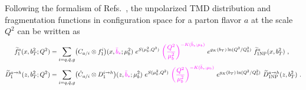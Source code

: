 \documentclass[aps,preprintnumbers,showpacs,nofootinbib,superscriptaddress,floatfix]{revtex4}
\newcommand{\AS}[1]{{\textcolor[rgb]{1,0,1}{#1}}}
\newcommand{\bT}{b_T}
\begin{document}
Following the formalism of Refs.~\cite{Collins:2011zzd,Aybat:2011zv}, the
unpolarized TMD distribution and fragmentation functions in configuration
space for a parton flavor $a$ at the scale $Q^2$ can be written as 
\begin{align}   
\widetilde{f}_1^a (x,  \bT^2; Q^2) &= \sum_{i=q,\bar q,g} \bigl( C_{a/i} \otimes f_1^i \bigr) (x,\AS{\bar{b}_\ast}; \mu_b^2) 
\  e^{S (\mu_b^2, Q^2)} \ \AS{\bigg( \frac{Q^2}{\mu_b^2} \bigg)^{-K(\bar{b}_\ast;\mu_b)}} \  e^{g_K(\bT) \ln (Q^2 / Q_0^2)} \  \widetilde{f}_{1 {\rm NP}}^a (x, \bT^2) \ ,
\label{e:TMDevol1} \\
\widetilde{D}_1^{a\to h} (z, \bT^2; Q^2) &= \sum_{i=q,\bar q,g} \bigl( \hat{C}_{a/i} \otimes D_1^{i\to h} \bigr) (z,\AS{\bar{b}_\ast}; \mu_b^2) \  e^{S (\mu_b^2, Q^2)} \ \AS{\bigg( \frac{Q^2}{\mu_b^2} \bigg)^{-K(\bar{b}_\ast;\mu_b)}} \  e^{g_K( \bT) \ln (Q^2 / Q_0^2)} \  \widetilde{D}_{1 {\rm NP}}^{a\to h} (z, \bT^2) \  .
\label{e:TMDevol2}
\end{align}
\end{document}
